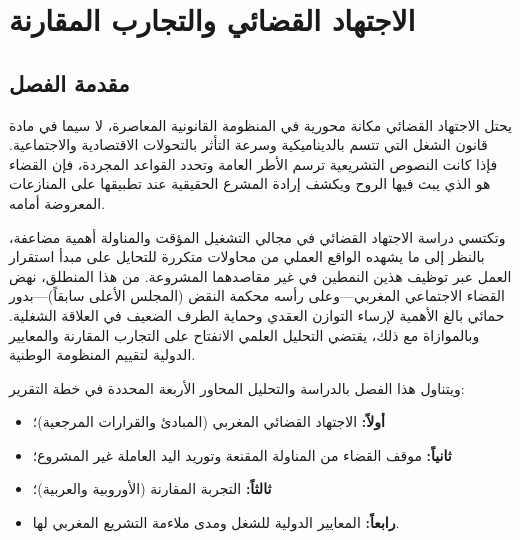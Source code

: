 
\chapter{الاجتهاد القضائي والتجارب المقارنة}
\label{chap:chapitre9}

\section*{مقدمة الفصل}

يحتل الاجتهاد القضائي مكانة محورية في المنظومة القانونية المعاصرة، لا سيما في مادة قانون الشغل التي تتسم بالديناميكية وسرعة التأثر بالتحولات الاقتصادية والاجتماعية. فإذا كانت النصوص التشريعية ترسم الأطر العامة وتحدد القواعد المجردة، فإن القضاء هو الذي يبث فيها الروح ويكشف إرادة المشرع الحقيقية عند تطبيقها على المنازعات المعروضة أمامه.

وتكتسي دراسة الاجتهاد القضائي في مجالي التشغيل المؤقت والمناولة أهمية مضاعفة، بالنظر إلى ما يشهده الواقع العملي من محاولات متكررة للتحايل على مبدأ استقرار العمل عبر توظيف هذين النمطين في غير مقاصدهما المشروعة. من هذا المنطلق، نهض القضاء الاجتماعي المغربي—وعلى رأسه محكمة النقض (المجلس الأعلى سابقاً)—بدور حمائي بالغ الأهمية لإرساء التوازن العقدي وحماية الطرف الضعيف في العلاقة الشغلية. وبالموازاة مع ذلك، يقتضي التحليل العلمي الانفتاح على التجارب المقارنة والمعايير الدولية لتقييم المنظومة الوطنية.

ويتناول هذا الفصل بالدراسة والتحليل المحاور الأربعة المحددة في خطة التقرير:
\begin{itemize}[leftmargin=*, itemsep=4pt]
    \item \textbf{أولاً:} الاجتهاد القضائي المغربي (المبادئ والقرارات المرجعية)؛
    \item \textbf{ثانياً:} موقف القضاء من المناولة المقنعة وتوريد اليد العاملة غير المشروع؛
    \item \textbf{ثالثاً:} التجربة المقارنة (الأوروبية والعربية)؛
    \item \textbf{رابعاً:} المعايير الدولية للشغل ومدى ملاءمة التشريع المغربي لها.
\end{itemize}

